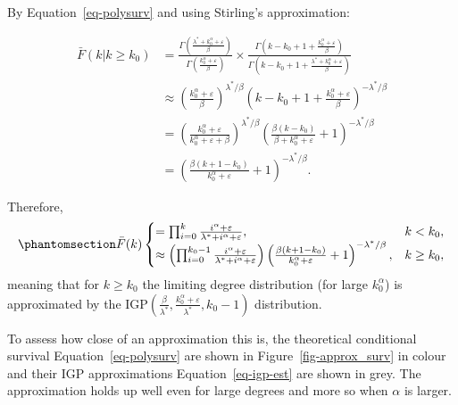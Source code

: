 \documentclass[
  sn-basic,
]{sn-jnl}
\theoremstyle{plain}
\theoremstyle{plain}
\theoremstyle{remark}
\begin{document}
By Equation~\ref{eq-polysurv} and using Stirling's approximation:

\begin{align*}
\bar F(k|k\ge k_0) &= \frac{\Gamma\left(\frac{\lambda^* + k_0^\alpha + \varepsilon}{\beta}\right)}{\Gamma\left(\frac{k_0^\alpha + \varepsilon}{\beta}\right)}\times\frac{\Gamma\left(k-k_0  +1 + \frac{k_0^\alpha + \varepsilon}{\beta}\right)}{\Gamma\left(k-k_0  +1 + \frac{\lambda^*+ k_0^\alpha + \varepsilon}{\beta}\right)}\\
&\approx\left(\frac{k_0^\alpha+\varepsilon}{\beta}\right)^{\lambda^*/\beta}\left(k-k_0+1+\frac{k_0^\alpha + \varepsilon}{\beta}\right)^{-\lambda^*/\beta}\\
&=\left(\frac{k_0^\alpha+\varepsilon}{k_0^\alpha+\varepsilon + \beta}\right)^{\lambda^*/\beta}\left(\frac{\beta(k-k_0)}{\beta + k_0^\alpha+\varepsilon} + 1\right)^{-\lambda^*/\beta}\\
&=\left(\frac{\beta(k+1-k_0)}{k_0^{\alpha}+\varepsilon} + 1\right)^{-\lambda^{*}/\beta}.
\end{align*}

Therefore, \begin{equation}\phantomsection\label{eq-igp-est}{
\bar F(k) 
\begin{cases}
=\prod_{i=0}^{k}\frac{i^\alpha + \varepsilon}{\lambda^*+i^\alpha + \varepsilon},&k<k_0,\\
\approx \left(\prod_{i=0}^{k_0-1}\frac{i^\alpha + \varepsilon}{\lambda^*+i^\alpha + \varepsilon}\right) \left(\frac{\beta(k+1-k_0)}{k_0^{\alpha}+\varepsilon} + 1\right)^{-\lambda^*/\beta},&k\ge k_0,
\end{cases}
}\end{equation} meaning that for \(k\ge k_0\) the limiting degree
distribution (for large \(k_0^\alpha\)) is approximated by the
\(\text{IGP}\left(\frac{\beta}{\lambda^*}, \frac{k_0^\alpha + \varepsilon}{\lambda^*},k_0-1\right)\)
distribution.

To assess how close of an approximation this is, the theoretical
conditional survival Equation~\ref{eq-polysurv} are shown in
Figure~\ref{fig-approx_surv} in colour and their IGP approximations
Equation~\ref{eq-igp-est} are shown in grey. The approximation holds up
well even for large degrees and more so when \(\alpha\) is larger.
\end{document}
